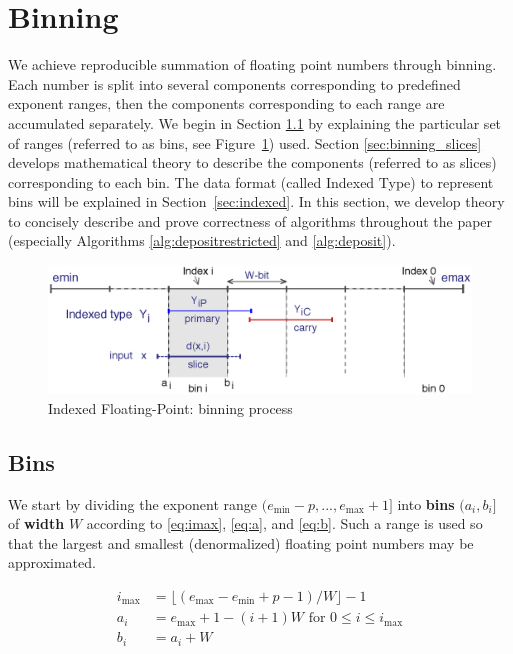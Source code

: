 \section{Binning}
\label{sec:binning}
We achieve reproducible summation of floating point numbers through binning.
Each number is split into several components corresponding to predefined
exponent ranges, then the components corresponding to each range are
accumulated separately. We begin in Section \ref{sec:binning_bins} by
explaining the particular set of ranges (referred to as bins, see Figure~\ref{fig:binning}) used.
Section \ref{sec:binning_slices} develops mathematical theory to describe the
components (referred to as slices) corresponding to each bin.
The data format (called Indexed Type) to represent bins will be
explained in Section~\ref{sec:indexed}.
In this section, we develop 
theory to concisely describe and prove correctness of algorithms throughout the
paper (especially Algorithms \ref{alg:depositrestricted} and \ref{alg:deposit}).

\begin{figure}[H]
\begin{center}
\includegraphics[width=\textwidth]{plots/indexedFP}
\caption{Indexed Floating-Point: binning process}
\label{fig:binning}
\end{center}
\end{figure}


    \subsection{Bins}
    \label{sec:binning_bins}
    We start by dividing the exponent range $(e_{\min} - p, ..., e_{\max} + 1]$
    into \textbf{bins} $(a_i, b_i]$ of \textbf{width} $W$ according to
    \eqref{eq:imax}, \eqref{eq:a}, and \eqref{eq:b}. Such a range is used so
    that the largest and smallest (denormalized) floating point numbers may be
    approximated.
    \begin{samepage}
    \begin{definition}
    \begin{align}
        i_{\max} & = \bigl\lfloor(e_{\max} - e_{\min} + p - 1)/W\bigr\rfloor - 1
            \label{eq:imax} \\
        a_i & = e_{\max} + 1 - (i + 1)W \text{ for } 0 \leq i \leq i_{\max}
            \label{eq:a} \\
        b_i & = a_i + W
            \label{eq:b}
    \end{align}
    \end{definition}
    \end{samepage}

